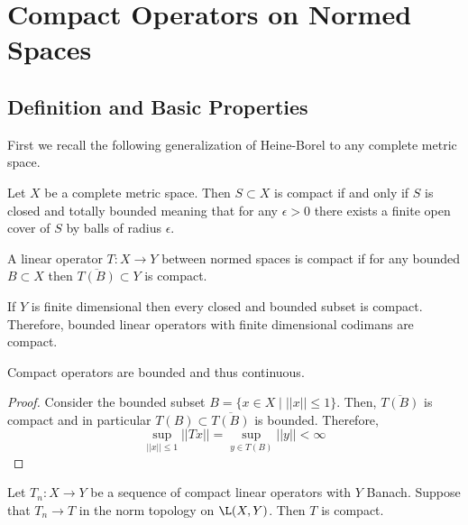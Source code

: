 \documentclass[12pt]{article}
\begin{document}
\section{Compact Operators on Normed Spaces}

\subsection{Definition and Basic Properties}

\begin{rmk}
First we recall the following generalization of Heine-Borel to any complete metric space.
\end{rmk}

\begin{prop}
Let $X$ be a complete metric space. Then $S \subset X$ is compact if and only if $S$ is closed and totally bounded meaning that for any $\epsilon > 0$ there exists a finite open cover of $S$ by balls of radius $\epsilon$.
\end{prop}

\begin{defn}
A linear operator $T : X \to Y$ between normed spaces is compact if for any bounded $B \subset X$ then $\overline{T(B)} \subset Y$ is compact. 
\end{defn}

\begin{example}
If $Y$ is finite dimensional then every closed and bounded subset is compact. Therefore, bounded linear operators with finite dimensional codimans are compact.
\end{example}

\begin{prop}
Compact operators are bounded and thus continuous.
\end{prop}

\begin{proof}
Consider the bounded subset $B = \{ x \in X \mid || x || \le 1 \}$. Then, $\overline{T(B)}$ is compact and in particular $T(B) \subset \overline{T(B)}$ is bounded. Therefore,
\[ \sup_{||x|| \le 1} || T x || = \sup_{y \in T(B)} || y || < \infty \]
\end{proof}


\begin{prop}
Let $T_n : X \to Y$ be a sequence of compact linear operators with $Y$ Banach. Suppose that $T_n \to T$ in the norm topology on $\L(X, Y)$. Then $T$ is compact.
\end{prop}
\end{document}
